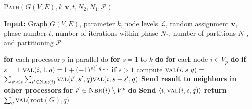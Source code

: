 \begin{algorithm}{}
\small
\caption{\parcircuit\textsc{Path}{$(G(V, E), k, \mathbf{v}, t, N_2, N_1, \mathcal{P})$}}
\label{alg:parEvaluatepath} 
\begin{algorithmic}[1]
\STATE \textbf{Input:} Graph $G(V, E)$, parameter $k$, node levels $\mathcal{L}$, 
random assignment $\mathbf{v}$, phase number $t$, number of iterations within phase $N_2$,
number of partitions $N_1$, and partitioning $\mathcal{P}$
\STATE

\STATE \textbf{for} each processor $p$ in parallel do
\STATE \quad \textbf{for} $s=1$ to $k$ \textbf{do}
\STATE \quad \quad \textbf{for} each node $i\in V_p$ \textbf{do}
\STATE \quad \quad \quad \textbf{if} $s=1$ $ \textsc{val}(i, 1, q) = 1 + (-1)^{v_i^T \cdot q_{\text{bin}}}$
\STATE \quad \quad \quad \textbf{if} $s>1$ compute $\textsc{val}(i, s, q) =$
\STATE \quad \quad \quad \quad \quad $\sum_{s'<s} \sum_{i'\in\textsc{Nbr}(i)} \textsc{val}(i', s', q)\textsc{val}(i, s-s', q)$
\STATE \quad \quad \quad \textbf{Send result to neighbors in other processors}
\STATE \quad \quad \quad \textbf{for} $i' \in \textsc{Nbr}(i) \setminus V^{p}$ \textbf{do}
\STATE \quad \quad \quad \quad \textbf{Send} $\langle i, \textsc{val}(i, s, q)\rangle$
\STATE \textbf{return} $\sum_q \textsc{val}($root$(G), q)$
\end{algorithmic}
\end{algorithm}

\iffalse
{}

